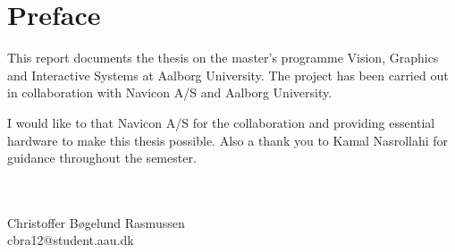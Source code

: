 \glsresetall
\section*{Preface}
This report documents the thesis on the master's programme Vision, Graphics and Interactive Systems at Aalborg University. The project has been carried out in collaboration with Navicon A/S and Aalborg University.

I would like to that Navicon A/S for the collaboration and providing essential hardware to make this thesis possible. Also a thank you to Kamal Nasrollahi for guidance throughout the semester.


\vfill
~\\
\makebox[8 cm]{\hrulefill}\\
Christoffer Bøgelund Rasmussen\\
cbra12@student.aau.dk\\
